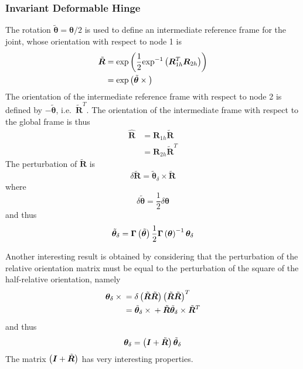 \documentclass[10pt,dvips,fleqn,subeqn]{report}
\newcommand{\T}[1]{\bm{#1}}
\begin{document}
\subsubsection{Invariant Deformable Hinge}
\label{sec:deformable-hinge-invariant}
The rotation $\tilde{\T{\theta}}=\T{\theta}/2$
is used to define an intermediate reference frame for the joint,
whose orientation with respect to node 1 is
\begin{align}
	\tilde{\T{R}}
	&= \llk{exp}\plbr{\frac{1}{2}\llk{exp}^{-1}\plbr{\T{R}_{1h}^T \T{R}_{2h}}} \nonumber \\
	&= \llk{exp}\plbr{\tilde{\T{\theta}}\times{}}
\end{align}
The orientation of the intermediate reference frame with respect 
to node 2 is defined by $-\tilde{\T{\theta}}$, i.e.\ $\tilde{\T{R}}^T$.
The orientation of the intermediate frame with respect
to the global frame is thus
\begin{subequations}
\begin{align}
	\hat{\T{R}} &= \T{R}_{1h} \tilde{\T{R}}
		\label{eq:inv-def-h-hatR-1} \\
	&= \T{R}_{2h} \tilde{\T{R}}^T
		\label{eq:inv-def-h-hatR-2}
\end{align}
\end{subequations}
The perturbation of $\tilde{\T{R}}$ is
\begin{equation}
	\delta\tilde{\T{R}} = \tilde{\T{\theta}}_{\delta}\times\tilde{\T{R}}
\end{equation}
where
\begin{equation}
	\delta\tilde{\T{\theta}} = \frac{1}{2} \delta \T{\theta}
\end{equation}
and thus
\begin{equation}
	\tilde{\T{\theta}}_{\delta} = \T{\Gamma}\plbr{\tilde{\T{\theta}}} \frac{1}{2} \T{\Gamma}\plbr{\T{\theta}}^{-1} \T{\theta}_{\delta} 
\end{equation}

Another interesting result is obtained by considering that
the perturbation of the relative orientation matrix
must be equal to the perturbation of the square 
of the half-relative orientation, namely
\begin{align}
	\T{\theta}_{\delta} \times{}
	&= \delta\plbr{\tilde{\T{R}}\tilde{\T{R}}} \plbr{\tilde{\T{R}}\tilde{\T{R}}}^T \nonumber \\
	&= \tilde{\T{\theta}}_{\delta} \times{} + \tilde{\T{R}} \tilde{\T{\theta}}_{\delta} \times \tilde{\T{R}}^T
\end{align}
and thus
\begin{equation}
	\T{\theta}_{\delta} = \plbr{\T{I} + \tilde{\T{R}}} \tilde{\T{\theta}}_{\delta}
	\label{eq:inv-def-h-theta-delta-tilde}
\end{equation}
The matrix $\plbr{\T{I} + \tilde{\T{R}}}$ has very interesting properties.
\end{document}
